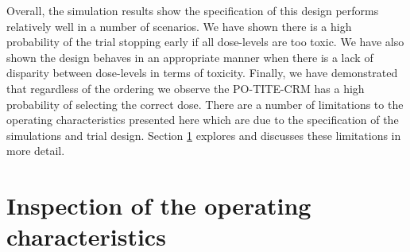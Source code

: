 Overall, the simulation results show the specification of this design performs relatively well in a number of scenarios. We have shown there is a high probability of the trial stopping early if all dose-levels are too toxic. We have also shown the design behaves in an appropriate manner when there is a lack of disparity between dose-levels in terms of toxicity. Finally, we have demonstrated that regardless of the ordering we observe the PO-TITE-CRM has a high probability of selecting the correct dose. There are a number of limitations to the operating characteristics presented here which are due to the specification of the simulations and trial design. Section \ref{section2.4} explores and discusses these limitations in more detail.


\section{Inspection of the operating characteristics}  
\label{section2.4}%



